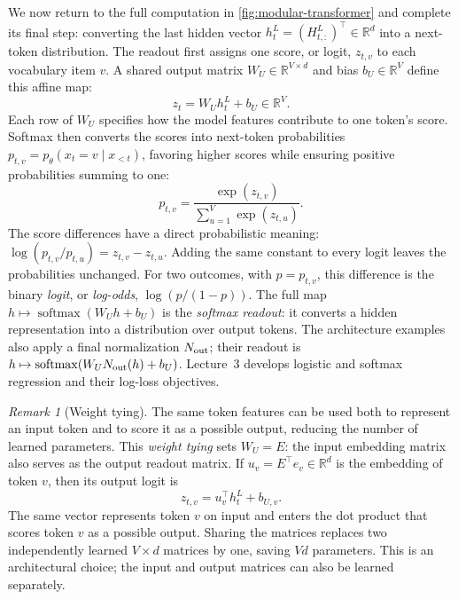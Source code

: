 \documentclass[11pt,twoside]{article}
\DeclareMathOperator{\softmax}{softmax}
\newcommand{\R}{\mathbb R}
\theoremstyle{plain}
\theoremstyle{definition}
\theoremstyle{remark}
\newtheorem{remark}{Remark}[section]
\begin{document}
We now return to the full computation in \cref{fig:modular-transformer}
and complete its final step: converting the last hidden vector
$h_t^L=(H^L_{t,:})^\top\in\R^d$ into a next-token distribution.
The readout first assigns one score, or logit, $z_{t,v}$ to each vocabulary item $v$.
A shared output matrix $W_U\in\R^{V\times d}$ and bias $b_U\in\R^V$ define
this affine map:
\begin{equation}
z_t=W_Uh_t^L+b_U\in\R^V.
\end{equation}
Each row of $W_U$ specifies how the model features contribute to one token's
score. Softmax then converts the scores into next-token probabilities
$p_{t,v}=p_\theta(x_t=v\mid x_{<t})$, favoring higher scores while ensuring
positive probabilities summing to one:
\begin{equation}
p_{t,v}=\frac{\exp(z_{t,v})}{\sum_{u=1}^V\exp(z_{t,u})}.
\end{equation}
The score differences have a direct probabilistic meaning:
$\log(p_{t,v}/p_{t,u})=z_{t,v}-z_{t,u}$. Adding the same constant to every
logit leaves the probabilities unchanged. For two outcomes, with $p=p_{t,v}$,
this difference is the binary \emph{logit}, or \emph{log-odds}, $\log(p/(1-p))$.
The full map $h\mapsto\softmax(W_Uh+b_U)$ is the \emph{softmax readout}:
it converts a hidden representation into a distribution over output tokens.
The architecture examples also apply a final normalization $N_{\rm out}$;
their readout is $h\mapsto\softmax(W_UN_{\rm out}(h)+b_U)$.
Lecture~3 develops logistic and softmax regression and their log-loss objectives.

\begin{remark}[Weight tying]
\label{rem:weight-tying}
The same token features can be used both to represent an input token and to
score it as a possible output, reducing the number of learned parameters.
This \emph{weight tying} sets $W_U=E$: the input embedding matrix also serves
as the output readout matrix. If $u_v=E^\top e_v\in\R^d$ is the embedding
of token $v$, then its output logit is
\begin{equation}
z_{t,v}=u_v^\top h_t^L+b_{U,v}.
\label{eq:tied-readout}
\end{equation}
The same vector represents token $v$ on input and enters the dot product that
scores token $v$ as a possible output. Sharing the matrices replaces two independently learned
$V\times d$ matrices by one, saving $Vd$ parameters. This is an architectural
choice; the input and output matrices can also be learned separately.
\end{remark}
\end{document}
